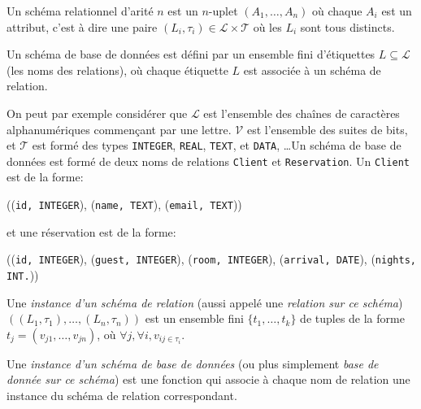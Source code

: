 \documentclass[french, toc]{../cs-classes/cs-classes}
\renewcommand*{\L}{\mathcal{L}}
\newcommand*{\V}{\mathcal{V}}
\newcommand*{\T}{\mathcal{T}}
\begin{document}
\begin{definition}
    Un schéma relationnel d'arité $n$ est un $n$-uplet $(A_1, \dots, A_n)$ où chaque $A_i$ est un attribut, c'est à dire une paire $(L_i, \tau_i)\in \L\times\T$ où les $L_i$ sont tous distincts.
\end{definition}

\begin{definition}
    Un schéma de base de données est défini par un ensemble fini d'étiquettes $L\subseteq\L$ (les noms des relations), où chaque étiquette $L$ est associée à un schéma de relation.
\end{definition}

\begin{exemple}
    On peut par exemple considérer que $\L$ est l'ensemble des chaînes de caractères alphanumériques commençant par une lettre. $\V$ est l'ensemble des suites de bits, et $\T$ est formé des types \texttt{INTEGER}, \texttt{REAL}, \texttt{TEXT}, et \texttt{DATA}, \dots Un schéma de base de données est formé de deux noms de relations \texttt{Client} et \texttt{Reservation}. Un \texttt{Client} est de la forme:
    \begin{center}
        ((\texttt{id, INTEGER}), (\texttt{name, TEXT}), (\texttt{email, TEXT}))
    \end{center}
    et une réservation est de la forme:
    \begin{center}
        ((\texttt{id, INTEGER}), (\texttt{guest, INTEGER}), (\texttt{room, INTEGER}), (\texttt{arrival, DATE}), (\texttt{nights, INT.}))
    \end{center}
\end{exemple}

\begin{definition}
    Une \emph{instance d'un schéma de relation} (aussi appelé une \emph{relation sur ce schéma}) $((L_1, \tau_1), \dots, (L_n, \tau_n))$ est un ensemble fini $\{t_1, \dots, t_k\}$ de tuples de la forme $t_j=(v_{j1}, \dots, v_{jn})$, où $\forall j, \forall i, v_{ij\in\tau_i}$.
\end{definition}

\begin{definition}
    Une \emph{instance d'un schéma de base de données} (ou plus simplement \emph{base de donnée sur ce schéma}) est une fonction qui associe à chaque nom de relation une instance du schéma de relation correspondant.
\end{definition}
\end{document}
